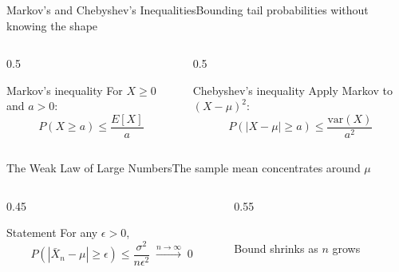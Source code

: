 \documentclass[aspectratio=169,11pt]{beamer}
\begin{document}
\begin{frame}{Markov's and Chebyshev's Inequalities}{Bounding tail probabilities without knowing the shape}
  \begin{columns}[T]
    \begin{column}{0.5\textwidth}
      \begin{block}{Markov's inequality}
        \small For $X \ge 0$ and $a>0$:
        \[ P(X \ge a) \le \frac{E[X]}{a} \]
      \end{block}
    \end{column}
    \begin{column}{0.5\textwidth}
      \begin{exampleblock}{Chebyshev's inequality}
        \small Apply Markov to $(X-\mu)^2$:
        \[ P(|X-\mu|\ge a) \le \frac{\text{var}(X)}{a^2} \]
      \end{exampleblock}
    \end{column}
  \end{columns}
\end{frame}

\begin{frame}{The Weak Law of Large Numbers}{The sample mean concentrates around $\mu$}
  \begin{columns}[T]
    \begin{column}{0.45\textwidth}
      \begin{block}{Statement}
        \small For any $\epsilon>0$,
        \[ P(|\bar X_n - \mu| \ge \epsilon) \le \frac{\sigma^2}{n\epsilon^2}
           \;\xrightarrow{n\to\infty}\; 0 \]
      \end{block}
    \end{column}
    \begin{column}{0.55\textwidth}
      \centering
      \\
      \scriptsize Bound shrinks as $n$ grows
    \end{column}
  \end{columns}
\end{frame}
\end{document}
